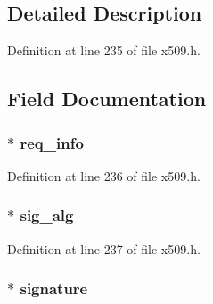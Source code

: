 \subsection{Detailed Description}


Definition at line 235 of file x509.\+h.



\subsection{Field Documentation}
\subsubsection[{\texorpdfstring{req\+\_\+info}{req_info}}]{ $\ast$ req\+\_\+info}\hypertarget{struct_x509__req__st_af4f0321a73b22bed3bfc40e3ac294556}{}\label{struct_x509__req__st_af4f0321a73b22bed3bfc40e3ac294556}


Definition at line 236 of file x509.\+h.

\subsubsection[{\texorpdfstring{sig\+\_\+alg}{sig_alg}}]{ $\ast$ sig\+\_\+alg}\hypertarget{struct_x509__req__st_a48635ef8176d7ad1ab56a1088f7321fb}{}\label{struct_x509__req__st_a48635ef8176d7ad1ab56a1088f7321fb}


Definition at line 237 of file x509.\+h.

\subsubsection[{\texorpdfstring{signature}{signature}}]{ $\ast$ signature}\hypertarget{struct_x509__req__st_a0ded22400c40848a864a98aeb7946f1a}{}\label{struct_x509__req__st_a0ded22400c40848a864a98aeb7946f1a}


